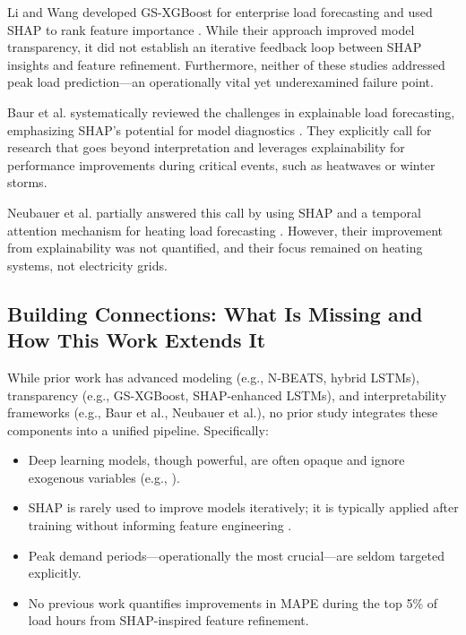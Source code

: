 \documentclass[final,numbered]{ifacconf}
\begin{document}
Li and Wang developed GS-XGBoost for enterprise load forecasting and used SHAP to rank feature importance \cite{Li2022PowerLF}. While their approach improved model transparency, it did not establish an iterative feedback loop between SHAP insights and feature refinement. Furthermore, neither of these studies addressed peak load prediction—an operationally vital yet underexamined failure point.

Baur et al. systematically reviewed the challenges in explainable load forecasting, emphasizing SHAP’s potential for model diagnostics \cite{baur2024explainability}. They explicitly call for research that goes beyond interpretation and leverages explainability for performance improvements during critical events, such as heatwaves or winter storms.

Neubauer et al. partially answered this call by using SHAP and a temporal attention mechanism for heating load forecasting \cite{neubauer2025explainableb}. However, their improvement from explainability was not quantified, and their focus remained on heating systems, not electricity grids.

\subsection{Building Connections: What Is Missing and How This Work Extends It}

While prior work has advanced modeling (e.g., N-BEATS, hybrid LSTMs), transparency (e.g., GS-XGBoost, SHAP-enhanced LSTMs), and interpretability frameworks (e.g., Baur et al., Neubauer et al.), no prior study integrates these components into a unified pipeline. Specifically:

\begin{itemize}
    \item Deep learning models, though powerful, are often opaque and ignore exogenous variables (e.g., \cite{Oreshkin2020NBEATSNN, Kasprzyk2024EnhancedNF}).
    \item SHAP is rarely used to improve models iteratively; it is typically applied after training without informing feature engineering \cite{Li2022PowerLF, Wu2022AnEF}.
    \item Peak demand periods—operationally the most crucial—are seldom targeted explicitly.
    \item No previous work quantifies improvements in MAPE during the top 5\% of load hours from SHAP-inspired feature refinement.
\end{itemize}
\end{document}
